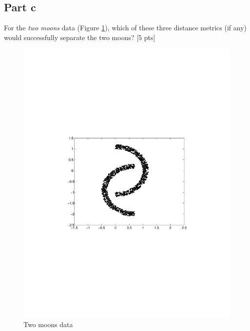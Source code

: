 \documentclass[12pt]{article}
\begin{document}
\subsection*{Part c}
For the \emph{two moons} data (Figure \ref{fig:twomoons}), which of these three distance metrics (if any) would successfully separate the two moons? [5 pts]
\begin{figure}[h]
\includegraphics[trim = 0mm 90mm 0mm 90mm, clip, width = \linewidth]{clustering}
\caption{Two moons data}
	\label{fig:twomoons}
\end{figure}
\vspace{1cm}






\end{document}
